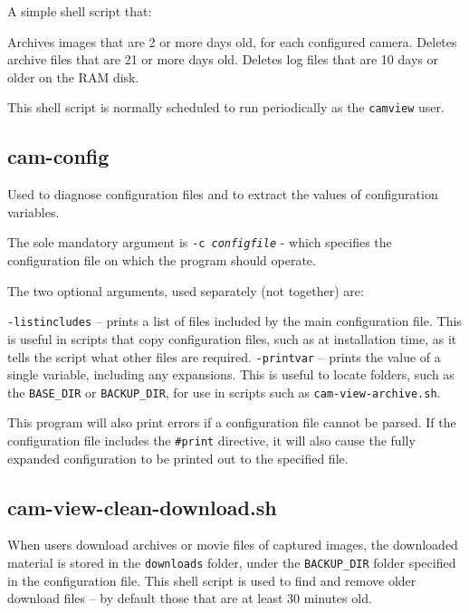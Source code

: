     A simple shell script that:

    \BI
    \I Archives images that are 2 or more days old, for each configured camera.
    \I Deletes archive files that are 21 or more days old.
    \I Deletes log files that are 10 days or older on the RAM disk.
    \EI

    This shell script is normally scheduled to run periodically as
    the \texttt{camview} user.

  \subsection{cam-config}

    Used to diagnose configuration files and to extract the values of
    configuration variables.

    The sole mandatory argument is \texttt{-c \emph{configfile}} - which
    specifies the configuration file on which the program should operate.

    The two optional arguments, used separately (not together) are:

    \BI
    \I \texttt{-listincludes} -- prints a list of files included by the
       main configuration file.  This is useful in scripts that copy
       configuration files, such as at installation time, as it tells
       the script what other files are required.
    \I \texttt{-printvar} -- prints the value of a single variable,
       including any expansions.  This is useful to locate folders,
       such as the \texttt{BASE\_DIR} or \texttt{BACKUP\_DIR}, for use
       in scripts such as \texttt{cam-view-archive.sh}.
    \EI

    This program will also print errors if a configuration file
    cannot be parsed.  If the configuration file includes the
    \texttt{\#print} directive, it will also cause the fully expanded
    configuration to be printed out to the specified file.

  \subsection{cam-view-clean-download.sh}

    When users download archives or movie files of captured images,
    the downloaded material is stored in the \texttt{downloads} folder,
    under the \texttt{BACKUP\_DIR} folder specified in the configuration
    file.  This shell script is used to find and remove older download
    files -- by default those that are at least 30 minutes old.

